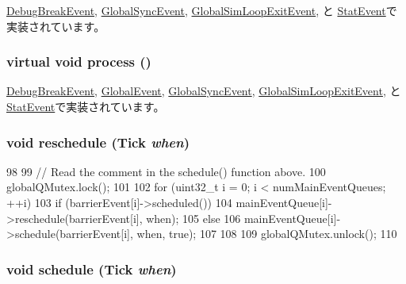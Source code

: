 \hyperlink{structDebugBreakEvent_a5a14fe478e2393ff51f02e9b7be27e00}{DebugBreakEvent}, \hyperlink{classGlobalSyncEvent_a5a14fe478e2393ff51f02e9b7be27e00}{GlobalSyncEvent}, \hyperlink{classGlobalSimLoopExitEvent_a5a14fe478e2393ff51f02e9b7be27e00}{GlobalSimLoopExitEvent}, と \hyperlink{classStats_1_1StatEvent_a2bd90422eece9190794479e08092a252}{StatEvent}で実装されています。\hypertarget{classBaseGlobalEvent_a142b75b68a6291400e20fb0dd905b1c8}{
\subsubsection[{process}]{\setlength{\rightskip}{0pt plus 5cm}virtual void process ()}}
\label{classBaseGlobalEvent_a142b75b68a6291400e20fb0dd905b1c8}


\hyperlink{structDebugBreakEvent_a2e9c5136d19b1a95fc427e0852deab5c}{DebugBreakEvent}, \hyperlink{classGlobalEvent_a142b75b68a6291400e20fb0dd905b1c8}{GlobalEvent}, \hyperlink{classGlobalSyncEvent_a2e9c5136d19b1a95fc427e0852deab5c}{GlobalSyncEvent}, \hyperlink{classGlobalSimLoopExitEvent_a2e9c5136d19b1a95fc427e0852deab5c}{GlobalSimLoopExitEvent}, と \hyperlink{classStats_1_1StatEvent_a6780fc1879338e1ff38faf7279ec6a0b}{StatEvent}で実装されています。\hypertarget{classBaseGlobalEvent_afe2a0f92341ee6efef34e3d8eeea299d}{
\subsubsection[{reschedule}]{\setlength{\rightskip}{0pt plus 5cm}void reschedule ({\bf Tick} {\em when})}}
\label{classBaseGlobalEvent_afe2a0f92341ee6efef34e3d8eeea299d}



\begin{DoxyCode}
98 {
99     // Read the comment in the schedule() function above.
100     globalQMutex.lock();
101 
102     for (uint32_t i = 0; i < numMainEventQueues; ++i) {
103         if (barrierEvent[i]->scheduled())
104             mainEventQueue[i]->reschedule(barrierEvent[i], when);
105         else
106             mainEventQueue[i]->schedule(barrierEvent[i], when, true);
107     }
108 
109     globalQMutex.unlock();
110 }
\end{DoxyCode}
\hypertarget{classBaseGlobalEvent_a5220ca6f213232cef86e6fba80ba9a70}{
\subsubsection[{schedule}]{\setlength{\rightskip}{0pt plus 5cm}void schedule ({\bf Tick} {\em when})}}
\label{classBaseGlobalEvent_a5220ca6f213232cef86e6fba80ba9a70}



